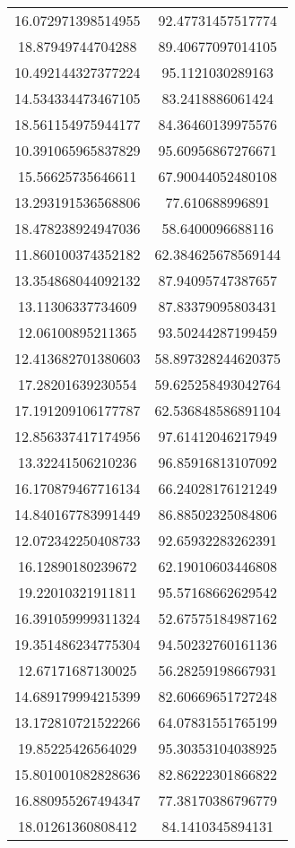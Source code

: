 \begin{table}
\begin{tabular}{cc}
16.072971398514955 & 92.47731457517774 \\
18.87949744704288 & 89.40677097014105 \\
10.492144327377224 & 95.1121030289163 \\
14.534334473467105 & 83.2418886061424 \\
18.561154975944177 & 84.36460139975576 \\
10.391065965837829 & 95.60956867276671 \\
15.56625735646611 & 67.90044052480108 \\
13.293191536568806 & 77.610688996891 \\
18.478238924947036 & 58.6400096688116 \\
11.860100374352182 & 62.384625678569144 \\
13.354868044092132 & 87.94095747387657 \\
13.11306337734609 & 87.83379095803431 \\
12.06100895211365 & 93.50244287199459 \\
12.413682701380603 & 58.897328244620375 \\
17.28201639230554 & 59.625258493042764 \\
17.191209106177787 & 62.536848586891104 \\
12.856337417174956 & 97.61412046217949 \\
13.32241506210236 & 96.85916813107092 \\
16.170879467716134 & 66.24028176121249 \\
14.840167783991449 & 86.88502325084806 \\
12.072342250408733 & 92.65932283262391 \\
16.12890180239672 & 62.19010603446808 \\
19.22010321911811 & 95.57168662629542 \\
16.391059999311324 & 52.67575184987162 \\
19.351486234775304 & 94.50232760161136 \\
12.67171687130025 & 56.28259198667931 \\
14.689179994215399 & 82.60669651727248 \\
13.172810721522266 & 64.07831551765199 \\
19.85225426564029 & 95.30353104038925 \\
15.801001082828636 & 82.86222301866822 \\
16.880955267494347 & 77.38170386796779 \\
18.01261360808412 & 84.1410345894131 \\

\end{tabular}
\end{table}
